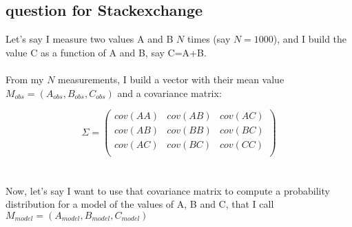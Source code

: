 \documentclass[11pt]{scrartcl}
\begin{document}
\subsection{question for Stackexchange}

Let's say I measure two values A and B $N$ times
(say $N=1000$), and I build the value C as a function of A and B, 
say C=A+B.\\
\\
From my $N$ measurements, I build a vector 
with their mean value $M_{obs}=(A_{obs}, B_{obs}, C_{obs})$ and a 
covariance matrix:

\begin{equation*}
\Sigma=
  \begin{pmatrix}
    cov(AA) & cov(AB) & cov(AC) \\
    cov(AB) & cov(BB) & cov(BC) \\
    cov(AC) & cov(BC) & cov(CC) \\      
  \end{pmatrix}
\end{equation*}
\\
\\
Now, let's say I want to use that covariance matrix to compute a 
probability distribution for a model of the values of A, B and C, that 
I call $M_{model} = (A_{model}, B_{model}, C_{model})$
\end{document}
